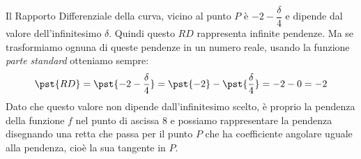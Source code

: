 \begin{esempio}
Il Rapporto Differenziale della curva, vicino al punto \(P\)
è \(-2-\dfrac{\delta}{4}\) 
e dipende dal valore dell'infinitesimo \(\delta\).
Quindi questo \(RD\) rappresenta infinite pendenze.
Ma se trasformiamo ognuna di queste pendenze in un numero reale,
usando la funzione \emph{parte standard} otteniamo sempre:
\[\pst{RD}=\pst{-2-\dfrac{\delta}{4}} = 
  \pst{-2}-\pst{\dfrac{\delta}{4}} = -2 - 0 = -2\]
Dato che questo valore non dipende dall'infinitesimo scelto, è proprio la 
pendenza della funzione \(f\) nel punto di ascissa \(8\) e possiamo 
rappresentare la pendenza disegnando una retta che passa per il punto 
\(P\) che ha coefficiente angolare uguale alla pendenza, 
cioè la sua tangente in \(P\).
% 
% 
% 
\end{esempio}


